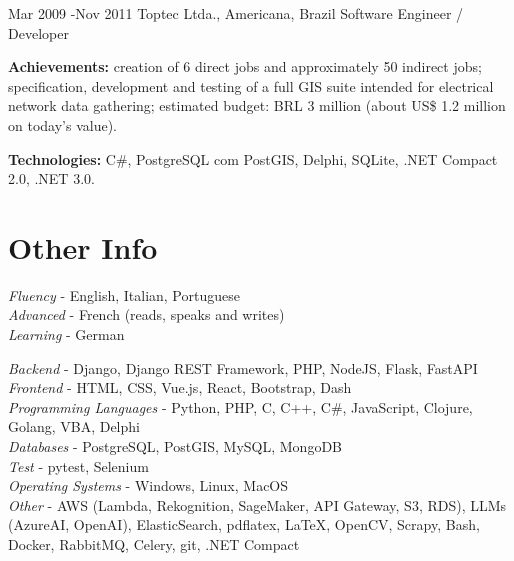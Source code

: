 \documentclass[10pt]{article} %
\begin{document}
\job
{Mar 2009 -}{Nov 2011}
{Toptec Ltda., Americana, Brazil}
{}
{Software Engineer / Developer}
{\rule{0mm}{2mm}\textbf{Achievements:} creation of 6 direct jobs and approximately 50 indirect jobs; specification, development and testing of a full GIS suite intended for electrical network data gathering; estimated budget: BRL 3 million (about US\$ 1.2 million on today’s value). \\
\rule{0mm}{3mm}\textbf{Technologies:} C\#, PostgreSQL com PostGIS, Delphi, SQLite, .NET Compact 2.0, .NET 3.0.}



\section{Other Info}

{
\textit{Fluency} - English, Italian, Portuguese\\
\textit{Advanced} - French (reads, speaks and writes)\\
\textit{Learning} - German\\
}


{
\textit{Backend} - Django, Django REST Framework, PHP, NodeJS, Flask, FastAPI\\
\textit{Frontend} - HTML, CSS, Vue.js, React, Bootstrap, Dash\\
\textit{Programming Languages} - Python, PHP, C, C++, C\#, JavaScript, Clojure, Golang, VBA, Delphi\\
\textit{Databases} - PostgreSQL, PostGIS, MySQL, MongoDB\\
\textit{Test} - pytest, Selenium\\
\textit{Operating Systems} - Windows, Linux, MacOS\\
\textit{Other} - AWS (Lambda, Rekognition, SageMaker, API Gateway, S3, RDS), LLMs (AzureAI, OpenAI), ElasticSearch, pdflatex, LaTeX, OpenCV, Scrapy, Bash, Docker, RabbitMQ, Celery, git, .NET Compact\\
}
\end{document}
